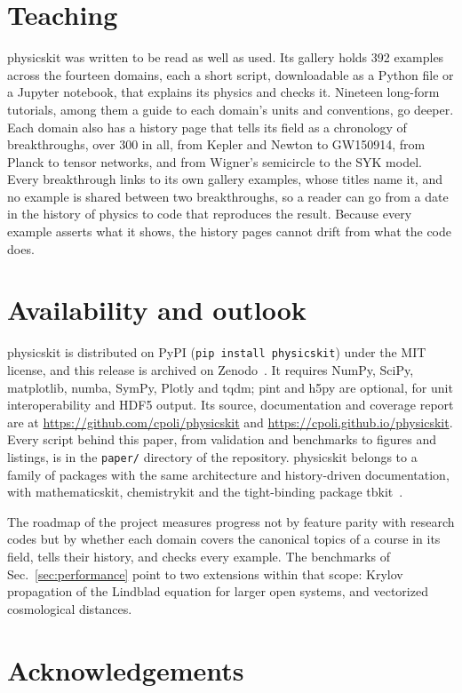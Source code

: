 \documentclass[11pt,a4paper]{article}
\newcommand{\code}[1]{\texttt{#1}}
\begin{document}
\section{Teaching}
\label{sec:teaching}

physicskit was written to be read as well as used. Its gallery holds 392
examples across the fourteen domains, each a short script, downloadable as
a Python file or a Jupyter notebook, that explains its physics and checks
it. Nineteen long-form tutorials, among them a guide to each domain's units
and conventions, go deeper. Each domain also has a history page that tells
its field as a chronology of breakthroughs, over 300 in all, from Kepler and Newton to
GW150914, from Planck to tensor networks, and from Wigner's semicircle to
the SYK model. Every breakthrough links to its own gallery examples, whose
titles name it, and no example is shared between two breakthroughs, so a
reader can go from a date in the history of physics to code that
reproduces the result. Because every example asserts what it shows, the
history pages cannot drift from what the code does.

\section{Availability and outlook}
\label{sec:outlook}

physicskit is distributed on PyPI (\code{pip install physicskit}) under the
MIT license, and this release is archived on Zenodo~\cite{physicskit}. It
requires NumPy, SciPy, matplotlib, numba, SymPy, Plotly and tqdm;
pint and h5py are optional, for unit interoperability and HDF5 output.
Its source, documentation and coverage report are at
\url{https://github.com/cpoli/physicskit} and
\url{https://cpoli.github.io/physicskit}. Every script behind this paper,
from validation and benchmarks to figures and listings, is in the
\code{paper/} directory of the repository. physicskit belongs to a family
of packages with the same architecture and history-driven documentation,
with mathematicskit, chemistrykit and the tight-binding package
tbkit~\cite{tbkit}.

The roadmap of the project measures progress not by feature parity with
research codes but by whether each domain covers the canonical topics of a
course in its field, tells their history, and checks every example. The
benchmarks of Sec.~\ref{sec:performance} point to two extensions within
that scope: Krylov propagation of the Lindblad equation for larger open
systems, and vectorized cosmological distances.

\section*{Acknowledgements}



\end{document}
